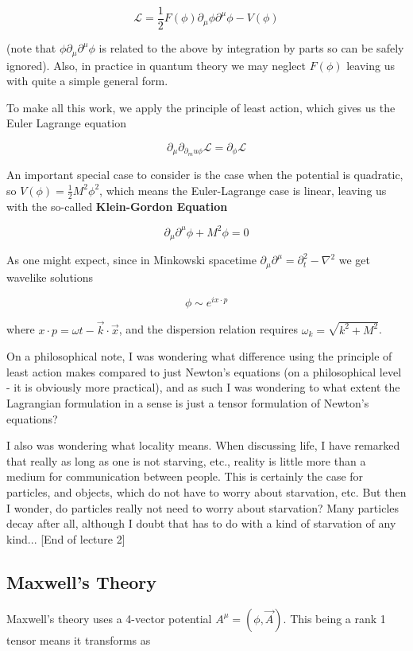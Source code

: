 \documentclass{article}
\theoremstyle{definition}
\begin{document}
$$ \mathcal{L} = \frac{1}{2} F(\phi) \partial_\mu \phi \partial^\mu \phi - V(\phi) $$

(note that $\phi \partial_\mu \partial^\mu \phi$ is related to the above by
integration by parts so can be safely ignored). Also, in practice in quantum
theory we may neglect $F(\phi)$ leaving us with quite a simple general form.

To make all this work, we apply the principle of least action, which gives us
the Euler Lagrange equation

$$ \partial_\mu \partial_{\partial_mu \phi} \mathcal{L} = \partial_\phi
\mathcal{L} $$

An important special case to consider is the case when the potential is
quadratic, so $V(\phi) = \frac{1}{2} M^2 \phi^2$, which means the Euler-Lagrange
case is linear, leaving us with the so-called \textbf{Klein-Gordon Equation}

$$ \partial_\mu \partial^\mu \phi + M^2 \phi = 0 $$

As one might expect, since in Minkowski spacetime $\partial_\mu \partial^\mu =
\partial_t^2 - \nabla^2$ we get wavelike solutions

$$ \phi \sim e^{ix \cdot p} $$

where $x \cdot p = \omega t - \vec{k} \cdot \vec{x}$, and the dispersion
relation requires $\omega_k = \sqrt{k^2 + M^2}$.

On a philosophical note, I was wondering what difference using the principle of
least action makes compared to just Newton's equations (on a philosophical level
- it is obviously more practical), and as such I was wondering to what extent
the Lagrangian formulation in a sense is just a tensor formulation of Newton's
equations? 

I also was wondering what locality means. When discussing life, I have remarked
that really as long as one is not starving, etc., reality is little more than a
medium for communication between people. This is certainly the case for
particles, and objects, which do not have to worry about starvation, etc. But
then I wonder, do particles really not need to worry about starvation? Many
particles decay after all, although I doubt that has to do with a kind of
starvation of any kind... [End of lecture 2]

\subsection{Maxwell's Theory}

Maxwell's theory uses a 4-vector potential $A^\mu = (\phi, \vec{A})$. This being
a rank 1 tensor means it transforms as
\end{document}
